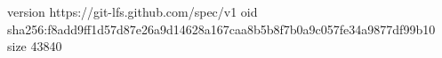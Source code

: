 version https://git-lfs.github.com/spec/v1
oid sha256:f8add9ff1d57d87e26a9d14628a167caa8b5b8f7b0a9c057fe34a9877df99b10
size 43840
